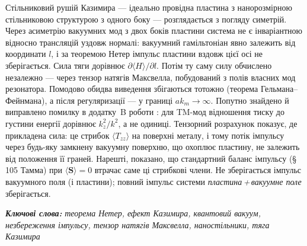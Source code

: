 \documentclass[twoside, 10pt]{article}
\begin{document}
Стільниковий рушій Казимира \cite{Drozdov2024} --- ідеально провідна пластина з нанорозмірною
стільниковою структурою з одного боку --- розглядається з погляду симетрій. Через асиметрію
вакуумних мод з двох боків пластини система не є інваріантною відносно трансляцій уздовж нормалі:
вакуумний гамільтоніан явно залежить від координати \(l\), і за теоремою Нетер імпульс пластини вздовж цієї осі не зберігається. Сила тяги дорівнює \(\partial\langle H\rangle/\partial l\). Потім ту саму
силу обчислено незалежно --- через тензор натягів Максвелла, побудований з полів власних мод
резонатора. Помодово обидва виведення збігаються тотожно (теорема Гельмана--Фейнмана), а після
регуляризації --- у границі \(ak_m\to\infty\). Попутно знайдено й виправлено помилку в додатку~B
роботи \cite{Drozdov2024}: для TM-мод відношення тиску до густини енергії дорівнює \(k_z^2/k^2\),
а не одиниці. Тензорний розрахунок показує, де прикладена сила: це стрибок \(\langle T_{zz}\rangle\)
на поверхні металу, і тому потік імпульсу через будь-яку замкнену вакуумну поверхню, що охоплює
пластину, не залежить від положення її граней. Нарешті, показано, що стандартний баланс імпульсу
(\S\,105 Тамма) при \(\langle\mathbf S\rangle=0\) втрачає саме ці стрибкові члени. Не зберігається імпульс вакуумного поля (і пластини); повний імпульс системи \emph{пластина\,+\,вакуумне поле} зберігається.

\vspace{3mm}

\noindent
\textbf{\textit{Ключові слова:}} \textit{теорема Нетер, ефект Казимира, квантовий вакуум, незбереження імпульсу, тензор натягів Максвелла, наностільники, тяга Казимира}
\end{document}
